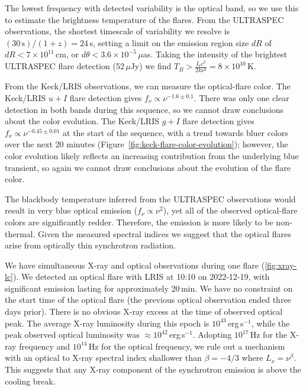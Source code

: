 \documentclass{nature_plusfigure}
\begin{document}
\begin{methods}
The lowest frequency with detected variability is the optical band, so we use this to estimate the brightness temperature of the flares.
From the ULTRASPEC observations, the shortest timescale of variability we resolve is $(30\,\mathrm{s})/(1+z) = 24\,$s, setting a limit on the emission region size $dR$ of $dR<7\times10^{11}\,$cm, or $d\theta < 3.6 \times 10^{-5}\,\mu$as. Taking the intensity of the brightest ULTRASPEC flare detection (52\,$\mu$Jy) we find $T_B > \frac{I_\nu c^2}{2 k\nu^2} = 8\times10^{10}\,$K.

From the Keck/LRIS observations, we can measure the optical-flare color. The Keck/LRIS $u+I$ flare detection gives $f_\nu \propto \nu^{-1.6\pm0.1}$. There was only one clear detection in both bands during this sequence, so we cannot draw conclusions about the color evolution. The Keck/LRIS $g+I$ flare detection gives $f_\nu \propto \nu^{-0.45\pm0.01}$ at the start of the sequence, with a trend towards bluer colors over the next 20 minutes (Figure~\ref{fig:keck-flare-color-evolution}); however, the color evolution likely reflects an increasing contribution from the underlying blue transient, so again we cannot draw conclusions about the evolution of the flare color.

The blackbody temperature inferred from the ULTRASPEC observations would result in very blue optical emission ($f_\nu\propto\nu^2$), yet all of the observed optical-flare colors are significantly redder. Therefore, the emission is more likely to be non-thermal. Given the measured spectral indices we suggest that the optical flares arise from optically thin synchrotron radiation. 

We have simultaneous X-ray and optical observations during one flare (\ref{fig:xray-lc}). We detected an optical flare with LRIS at 10:10 on 2022-12-19, with significant emission lasting for approximately 20\,min. We have no constraint on the start time of the optical flare (the previous optical observation ended three days prior). There is no obvious X-ray excess at the time of observed optical peak. The average X-ray luminosity during this epoch is $10^{43}\,$erg\,s$^{-1}$, while the peak observed optical luminosity was $\approx 10^{42}$\,erg\,s$^{-1}$.
Adopting $10^{17}\,$Hz for the X-ray frequency and $10^{14}\,$Hz for the optical frequency, we rule out a mechanism with an optical to X-ray spectral index shallower than $\beta=-4/3$ where $L_\nu = \nu^{\beta}$. This suggests that any X-ray component of the synchrotron emission is above the cooling break.


\end{methods}
\end{document}
